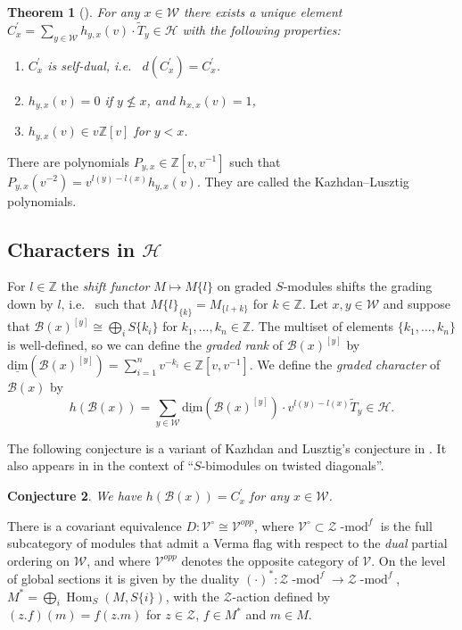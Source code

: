 \documentclass[12pt]{amsart}
\newtheorem{theorem}{Theorem}[section]
\newtheorem{conjecture}[theorem]{Conjecture}
\theoremstyle{definition}
\theoremstyle{remark}
\newcommand{\CH}{{\mathcal H}}
\newcommand{\CV}{{\mathcal V}}
\newcommand{\CW}{{\mathcal W}}
\newcommand{\CZ}{{\mathcal Z}}
\newcommand{\SB}{{\mathscr B}}
\newcommand{\DZ}{{\mathbb Z}}
\newcommand{\Hom}{{\operatorname{Hom}}}
\newcommand{\udim}{{\operatorname{\underline{dim}}}}
\newcommand{\catmod}{{\operatorname{-mod}}}
\begin{document}
\begin{theorem}[\cite{KL1}]\label{KLelts} For any $x\in\CW$ there exists a unique element $C_x^\prime=\sum_{y\in\CW} h_{y,x}(v)\cdot \tilde T_y\in\CH$ with the following properties:
\begin{enumerate}
\item \label{KLeltsd} $C_x^\prime$ is self-dual, i.e.~ $d(C^\prime_x)=C^\prime_x$. 
\item \label{KLeltss} $h_{y,x}(v)=0$ if $y\not\leq x$, and $h_{x,x}(v)=1$,
\item \label{KLeltsn} $h_{y,x}(v)\in v\DZ[v]$ for $y<x$. 
\end{enumerate}
\end{theorem} 

There are polynomials $P_{y,x}\in\DZ[v,v^{-1}]$ such that $P_{y,x}(v^{-2})=v^{l(y)-l(x)}h_{y,x}(v)$. They are called the Kazhdan--Lusztig polynomials.

\subsection{Characters in $\CH$}
 
For $l\in\DZ$ the {\em shift functor} $M\mapsto M\{l\}$ on graded $S$-modules shifts the grading down by $l$, i.e.~ such that $M\{l\}_{\{k\}}=M_{\{l+k\}}$ for $k\in\DZ$. Let $x,y\in\CW$ and suppose that $\SB(x)^{[y]}\cong\bigoplus_i S\{k_i\}$ for $k_1,\dots,k_n\in\DZ$. The multiset of elements $\{k_1,\dots,k_n\}$ is well-defined, so we can define the {\em graded rank} of $\SB(x)^{[y]}$  by $\udim(\SB(x)^{[y]})=\sum_{i=1}^n v^{-k_i}\in\DZ[v,v^{-1}]$. We define the {\em graded character} of $\SB(x)$ by
$$
h(\SB(x))=\sum_{y\in\CW}\udim(\SB(x)^{[y]})\cdot v^{l(y)-l(x)}\tilde T_y\in\CH.
$$

The following conjecture is a variant of Kazhdan and Lusztig's conjecture in \cite{KL1}. It also appears in \cite{Soe3} in the context of ``$S$-bimodules on twisted diagonals''.
 
\begin{conjecture}\label{KLcon} We have $h(\SB(x))=C_x^\prime$ for any $x\in\CW$. 
\end{conjecture}


There is a covariant equivalence
$D\colon \CV^\circ\cong\CV^{opp}$,
where $\CV^{\circ}\subset\CZ\catmod^f$ is the full subcategory of modules that admit a Verma flag with respect to the {\em dual} partial ordering on $\CW$, and where $\CV^{opp}$ denotes the opposite category of $\CV$. On the level of global sections it is given by the duality $(\cdot)^\ast\colon\CZ\catmod^f\to\CZ\catmod^f$, $M^\ast=\bigoplus_i \Hom_S(M,S\{i\})$, with the $\CZ$-action defined by $(z.f)(m)=f(z.m)$ for $z\in\CZ$, $f\in M^\ast$ and $m\in M$. 
\end{document}
